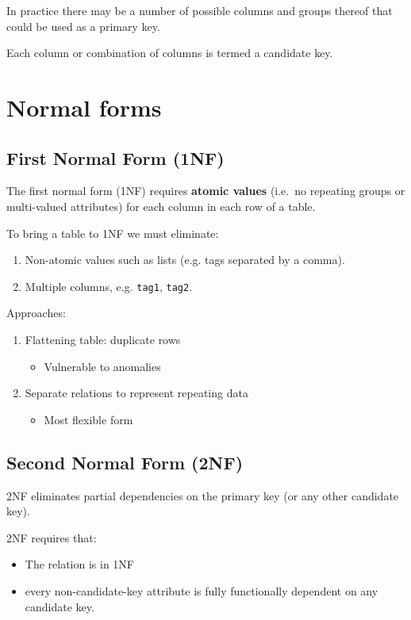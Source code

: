 \documentclass[slides]{pgnotes}
\begin{document}
In practice there may be a number of possible columns and groups thereof
that could be used as a primary key.

Each column or combination of columns is termed a candidate key.

\section{Normal forms}\label{normal-forms}

\subsection{First Normal Form (1NF)}\label{nf}

The first normal form (1NF) requires \textbf{atomic values} (i.e.~no repeating
groups or multi-valued attributes) for each column in each row of a table.

To bring a table to 1NF we must eliminate:
\begin{enumerate}
\item Non-atomic values such as lists (e.g. tags separated by a comma).
\item Multiple columns, e.g. \texttt{tag1}, \texttt{tag2}.
\end{enumerate}

Approaches:
\begin{enumerate}
\item
  Flattening table: duplicate rows
  \begin{itemize}
  \item
    Vulnerable to anomalies
  \end{itemize}
\item
  Separate relations to represent repeating data
  \begin{itemize}  
  \item
    Most flexible form
  \end{itemize}
\end{enumerate}


\subsection{Second Normal Form (2NF)}\label{nf-1}

2NF eliminates partial dependencies on the primary key (or any other candidate key).  

2NF requires that:

\begin{itemize}
\item
  The relation is in 1NF
\item
  every non-candidate-key attribute is fully functionally dependent on
  any candidate key.
\end{itemize}
\end{document}
